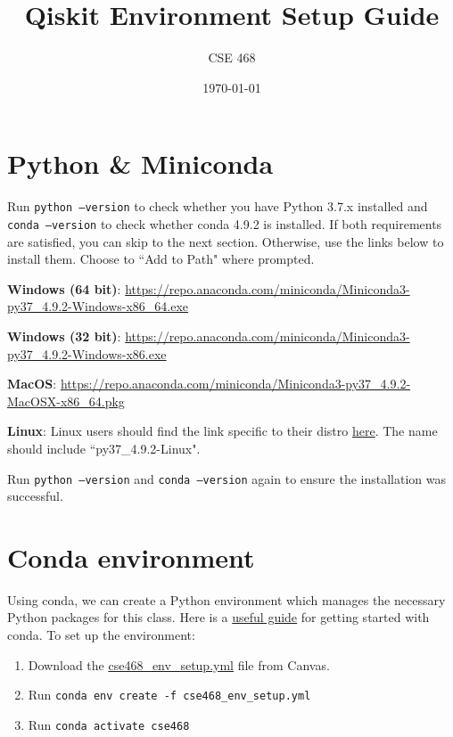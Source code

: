 \documentclass[12pt]{article}
\title{Qiskit Environment Setup Guide}
\author{CSE 468}
\date{\today}
\begin{document}
\maketitle
\tableofcontents
\newpage
\section{Python \& Miniconda}

Run \texttt{python --version} to check whether you have Python 3.7.x installed and \texttt{conda --version} to check whether conda 4.9.2 is installed. If both requirements are satisfied, you can skip to the next section. Otherwise, use the links below to install them. Choose to ``Add to Path" where prompted. \newline

\textbf{Windows (64 bit)}:
\href{https://repo.anaconda.com/miniconda/Miniconda3-py37_4.9.2-Windows-x86_64.exe}{https://repo.anaconda.com/miniconda/Miniconda3-py37\_4.9.2-Windows-x86\_64.exe}\newline

\textbf{Windows (32 bit)}: \href{https://repo.anaconda.com/miniconda/Miniconda3-py37_4.9.2-Windows-x86.exe}{https://repo.anaconda.com/miniconda/Miniconda3-py37\_4.9.2-Windows-x86.exe}\newline

\textbf{MacOS}:
\href{https://repo.anaconda.com/miniconda/Miniconda3-py37_4.9.2-MacOSX-x86_64.pkg}{https://repo.anaconda.com/miniconda/Miniconda3-py37\_4.9.2-MacOSX-x86\_64.pkg}\newline

\textbf{Linux}:
Linux users should find the link specific to their distro \href{https://repo.anaconda.com/miniconda/}{here}. The name should include ``py37\_4.9.2-Linux". \newline

Run \texttt{python --version} and \texttt{conda --version} again to ensure the installation was successful.


\section{Conda environment}
Using conda, we can create a Python environment which manages the necessary Python packages for this class. Here is a \href{https://docs.conda.io/projects/conda/en/latest/user-guide/getting-started.html}{useful guide} for getting started with conda. To set up the environment:
\begin{enumerate}
    \item Download the \href{FIXME}{cse468\_env\_setup.yml} file from Canvas.
    \item Run \texttt{conda env create -f cse468\_env\_setup.yml}
    \item Run \texttt{conda activate cse468}
\end{enumerate}
\end{document}
